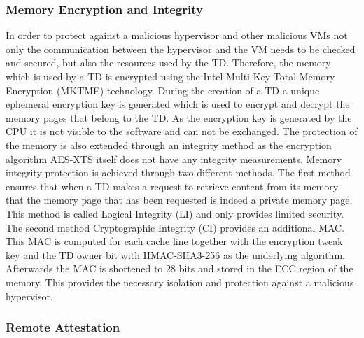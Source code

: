 \documentclass[sigplan,screen,nonacm]{acmart}
\begin{document}
\subsubsection{Memory Encryption and Integrity}

In order to protect against a malicious hypervisor and other malicious VMs not only the communication between the hypervisor and the VM needs to be checked and secured, but also the resources used by the TD.
Therefore, the memory which is used by a TD is encrypted using the Intel Multi Key Total Memory Encryption (MKTME) technology.
During the creation of a TD a unique ephemeral encryption key is generated which is used to encrypt and decrypt the memory pages that belong to the TD.
As the encryption key is generated by the CPU it is not visible to the software and can not be exchanged\cite{Intel-MKTME}.
The protection of the memory is also extended through an integrity method as the encryption algorithm AES-XTS itself does not have any integrity measurements.
Memory integrity protection is achieved through two different methods.
The first method ensures that when a TD makes a request to retrieve content from its memory that the memory page that has been requested is indeed a private memory page.
This method is called Logical Integrity (LI) and only provides limited security\cite[p. 120]{Intel-TDX-Module-Specs}.
The second method Cryptographic Integrity (CI) provides an additional MAC.
This MAC is computed for each cache line together with the encryption tweak key and the TD owner bit with HMAC-SHA3-256 as the underlying algorithm\cite[p. 3]{Intel-TDX-Whitepaper}.
Afterwards the MAC is shortened to 28 bits and stored in the ECC region of the memory.
This provides the necessary isolation and protection against a malicious hypervisor.

\subsubsection{Remote Attestation}
\end{document}
